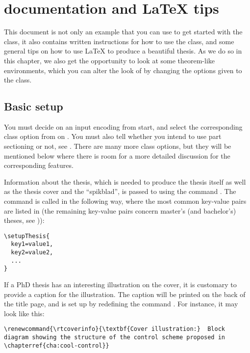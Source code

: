\chapter{\rtthesis documentation and \LaTeX{} tips}\label{cha:rtthesis}

This document is not only an example that you can use to get started with the \rtthesis class, it also contains written instructions for how to use the class, and some general tips on how to use \LaTeX{} to produce a beautiful thesis.  As we do so in this chapter, we also get the opportunity to look at some theorem-like environments, which you can alter the look of by changing the options given to the \rtthesis class.

\section{Basic setup}\label{sec:basic-setup}
%
You must decide on an input encoding from start, and select the corresponding class option from  on .  You must also tell \rtthesis whether you intend to use part sectioning or not, see .  There are many more class options, but they will be mentioned below where there is room for a more detailed discussion for the corresponding features.

Information about the thesis, which is needed to produce the thesis itself as well as the thesis cover and the “spikblad”, is passed to \rtthesis using the command .  The command is called in the following way, where the most common key-value pairs are listed in  (the remaining key-value pairs concern master's (and bachelor's) theses, see )):

\begin{minipage}{1.0\linewidth}
  \verbatimsize
\begin{verbatim}
\setupThesis{
  key1=value1,
  key2=value2,
  ...
}
\end{verbatim}
\end{minipage}

If a PhD thesis has an interesting illustration on the cover, it is customary to provide a caption for the illustration.  The caption will be printed on the back of the title page, and is set up by redefining the command .  For instance, it may look like this:

\begin{minipage}{1.0\linewidth}
  \verbatimsize
\begin{verbatim}
\renewcommand{\rtcoverinfo}{\textbf{Cover illustration:}  Block
diagram showing the structure of the control scheme proposed in
\chapterref{cha:cool-control}}
\end{verbatim}
\end{minipage}


